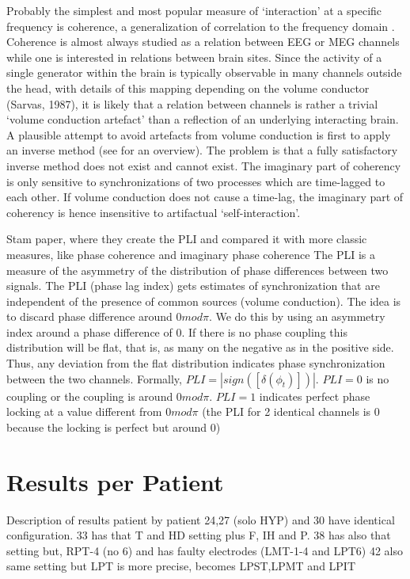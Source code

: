 \documentclass[11pt, onecolumn]{article}
\begin{document}
{%
Probably the simplest and most popular measure of ‘interaction’ at a specific frequency is coherence, a generalization of correlation to the frequency domain \citep{nunez1999eeg}.  Coherence is almost always studied as a relation between EEG or MEG channels while one is interested in relations between brain sites. Since the activity of a single generator within the brain
is typically observable in many channels outside the head, with details of this mapping depending on the volume conductor (Sarvas, 1987), it is likely that a relation between channels is rather a trivial ‘volume conduction artefact’ than a reflection of an underlying interacting brain. A plausible attempt to avoid artefacts from volume conduction is first to apply an inverse method (see \citep{baillet2001electromagnetic} for an overview). The problem is that a fully satisfactory inverse method does not exist and cannot exist. The imaginary part of coherency is only
sensitive to synchronizations of two processes which are
time-lagged to each other. If volume conduction does not
cause a time-lag, the imaginary part of coherency is hence insensitive to artifactual ‘self-interaction’.


Stam paper, where they create the PLI and compared it with more classic measures, like phase coherence \citep{mormann2000mean}and imaginary phase coherence \citep{nolte2004identifying}
The PLI is a measure of the asymmetry of the distribution of phase differences between two signals. The PLI (phase lag index) gets estimates of synchronization that are independent of the presence of common sources (volume conduction). The idea is to discard phase difference around $0 mod \pi$. We do this by using an asymmetry index around a phase difference of 0. If there is no phase coupling this distribution will be flat, that is, as many on the negative as in the positive side. Thus, any deviation from the flat distribution indicates phase synchronization between the two channels. Formally, $PLI = |sign([ \delta(\phi_t)])|$. $PLI = 0$ is no coupling or the coupling is around $0mod \pi$. $PLI =1$ indicates perfect phase locking at a value different from $0 mod \pi$ (the PLI for 2 identical channels is 0 because the locking is perfect but around 0)
\section{Results per Patient}
\label{se:results}

Description of results patient by patient
24,27 (solo HYP) and 30 have identical configuration.
33 has that T and HD setting plus F, IH and P.
38 has also that setting but, RPT-4 (no 6) and has faulty electrodes (LMT-1-4 and LPT6)
42 also same setting but LPT is more precise, becomes LPST,LPMT and LPIT

}
\end{document}
